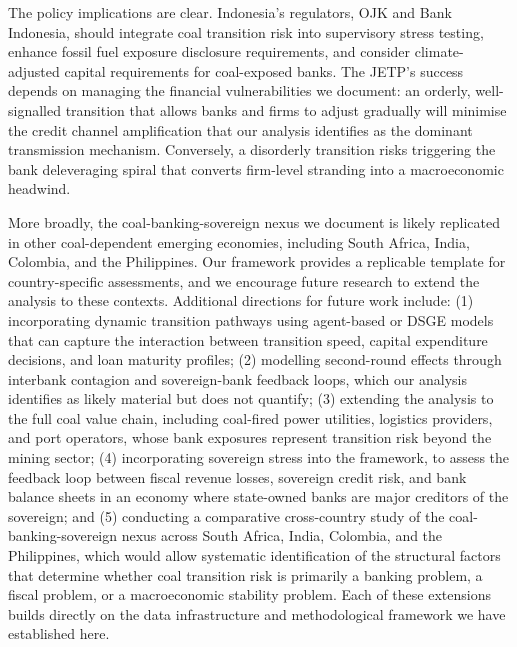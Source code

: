 The policy implications are clear. Indonesia's regulators, OJK and Bank Indonesia, should integrate coal transition risk into supervisory stress testing, enhance fossil fuel exposure disclosure requirements, and consider climate-adjusted capital requirements for coal-exposed banks. The JETP's success depends on managing the financial vulnerabilities we document: an orderly, well-signalled transition that allows banks and firms to adjust gradually will minimise the credit channel amplification that our analysis identifies as the dominant transmission mechanism. Conversely, a disorderly transition risks triggering the bank deleveraging spiral that converts firm-level stranding into a macroeconomic headwind.

More broadly, the coal-banking-sovereign nexus we document is likely replicated in other coal-dependent emerging economies, including South Africa, India, Colombia, and the Philippines. Our framework provides a replicable template for country-specific assessments, and we encourage future research to extend the analysis to these contexts. Additional directions for future work include: (1) incorporating dynamic transition pathways using agent-based or DSGE models that can capture the interaction between transition speed, capital expenditure decisions, and loan maturity profiles; (2) modelling second-round effects through interbank contagion and sovereign-bank feedback loops, which our analysis identifies as likely material but does not quantify; (3) extending the analysis to the full coal value chain, including coal-fired power utilities, logistics providers, and port operators, whose bank exposures represent transition risk beyond the mining sector; (4) incorporating sovereign stress into the framework, to assess the feedback loop between fiscal revenue losses, sovereign credit risk, and bank balance sheets in an economy where state-owned banks are major creditors of the sovereign; and (5) conducting a comparative cross-country study of the coal-banking-sovereign nexus across South Africa, India, Colombia, and the Philippines, which would allow systematic identification of the structural factors that determine whether coal transition risk is primarily a banking problem, a fiscal problem, or a macroeconomic stability problem. Each of these extensions builds directly on the data infrastructure and methodological framework we have established here.

